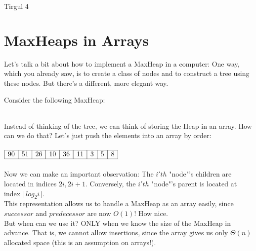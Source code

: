 \documentclass[12pt]{article}
\begin{document}
\begin{center}
\Huge{Tirgul 4}
\end{center}




\vspace{0.2in}


\vspace{0.2in}

\section{MaxHeaps in Arrays}

Let's talk a bit about how to implement a MaxHeap in a computer: One way, which you already saw, is to create a class of nodes and to construct a tree using these nodes. But there's a different, more elegant way.

Consider the following MaxHeap: \\
\\

Instead of thinking of the tree, we can think of storing the Heap in an array. How can we do that? Let's just push the elements into an array by order: \\ \\
$\begin{array}{|c|c|c|c|c|c|c|c|c|}
\hline
90 & 51 & 26 & 10 & 36 & 11 & 3 & 5 & 8\\
\hline
\end{array}$\\ \\
Now we can make an important observation: The $i'th$ "node"'s children are located in indices $2i, 2i+1$. Conversely, the $i'th$ "node"'s parent is located at index $\lfloor log_2 i \rfloor$. \\ 
This representation allows us to handle a MaxHeap as an array easily, since $successor$ and $predecessor$ are now $O(1)$! How nice. \\
But when can we use it? ONLY when we know the size of the MaxHeap in advance. That is, we cannot allow insertions, since the array gives us only $\Theta(n)$ allocated space (this is an assumption on arrays!).
\end{document}
